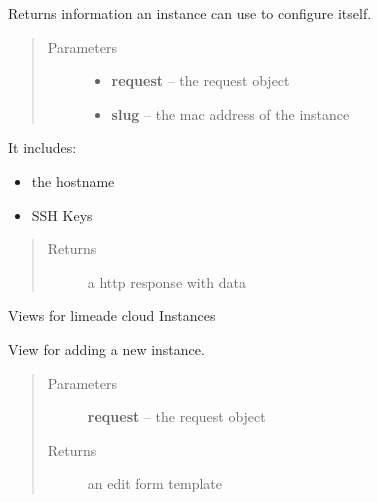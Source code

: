 \documentclass[letterpaper,10pt,english]{sphinxmanual}
\begin{document}
\begin{fulllineitems}
\label{api/cloud:limeade.cloud.views.api.instance_info}
Returns information an instance can use to configure itself.
\begin{quote}\begin{description}
\item[{Parameters}] \leavevmode\begin{itemize}
\item {} 
\textbf{request} -- the request object

\item {} 
\textbf{slug} -- the mac address of the instance

\end{itemize}

\end{description}\end{quote}

It includes:
\begin{itemize}
\item {} 
the hostname

\item {} 
SSH Keys

\end{itemize}
\begin{quote}\begin{description}
\item[{Returns}] \leavevmode
a http response with data

\end{description}\end{quote}

\end{fulllineitems}

\label{api/cloud:module-limeade.cloud.views.instance}
Views for limeade cloud Instances

\begin{fulllineitems}
\label{api/cloud:limeade.cloud.views.instance.instance_add}
View for adding a new instance.
\begin{quote}\begin{description}
\item[{Parameters}] \leavevmode
\textbf{request} -- the request object

\item[{Returns}] \leavevmode
an edit form template

\end{description}\end{quote}

\end{fulllineitems}
\end{document}
